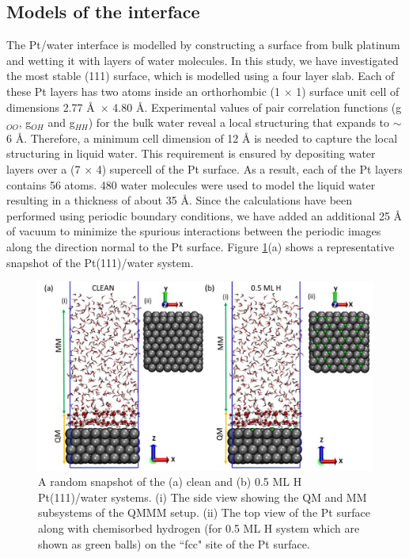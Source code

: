 \subsection{Models of the interface} 
The Pt/water interface is modelled by constructing a surface from 
bulk platinum and wetting it with layers of water molecules. In this study, we have investigated the most stable (111) surface, which is modelled using a four layer slab. Each of these Pt layers has two atoms inside an orthorhombic (1 $\times$ 1) surface unit cell of dimensions 2.77 \AA~$\times$ 4.80 \AA. Experimental values\cite{habershon2009competing} of pair correlation functions (g$_{OO}$, g$_{OH}$ and g$_{HH}$) for the bulk water reveal a local structuring that expands to $\sim$6 \AA{}. Therefore, a minimum cell dimension of 12 \AA{} is needed to capture the local structuring in liquid water. This requirement is ensured by depositing water layers over a (7 $\times$ 4) supercell of the Pt surface. As a result, each of the Pt layers contains 56 atoms. 480 water molecules were used to model the liquid water resulting in a thickness of about 35 \AA{}. Since the calculations have been performed using periodic boundary conditions, we have added an additional 25 \AA{} of vacuum to minimize the spurious interactions between the periodic images along the direction normal to the Pt surface. Figure \ref{fig:Slide6}(a) shows a representative snapshot of the Pt(111)/water system. 


\begin{figure}
    \centering
    \includegraphics[width=15cm ]{./Chapter3/figures/Slide6.jpg}
    \caption{A random snapshot of the (a) clean and (b) 0.5 ML H Pt(111)/water systems. (i) The side view showing the QM and MM subsystems of the QMMM setup. (ii) The top view of the Pt surface along with chemisorbed hydrogen (for 0.5 ML H system which are shown as green balls) on the ``fcc" site of the Pt surface. }
    \label{fig:Slide6}
\end{figure}

